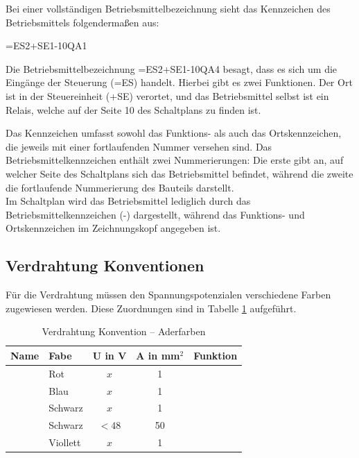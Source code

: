 Bei einer vollständigen Betriebsmittelbezeichnung sieht das Kennzeichen des Betriebsmittels folgendermaßen aus:

\begin{center} =ES2+SE1-10QA1 \end{center}

Die Betriebsmittelbezeichnung =ES2+SE1-10QA4 besagt, dass es sich um die Eingänge der Steuerung (=ES) handelt. Hierbei gibt es zwei Funktionen. Der Ort ist in der Steuereinheit (+SE) verortet, und das Betriebsmittel selbst ist ein Relais, welche auf der Seite 10 des Schaltplans zu finden ist.

Das Kennzeichen umfasst sowohl das Funktions- als auch das Ortskennzeichen, die jeweils mit einer fortlaufenden Nummer versehen sind. Das Betriebsmittelkennzeichen enthält zwei Nummerierungen: Die erste gibt an, auf welcher Seite des Schaltplans sich das Betriebsmittel befindet, während die zweite die fortlaufende Nummerierung des Bauteils darstellt.\\
Im Schaltplan wird das Betriebsmittel lediglich durch das Betriebsmittelkennzeichen (-) dargestellt, während das Funktions- und Ortskennzeichen im Zeichnungskopf angegeben ist.

\newpage

\subsection{Verdrahtung Konventionen}
\label{section:Verdrahtung_Konventionen}
Für die Verdrahtung müssen den Spannungspotenzialen verschiedene Farben zugewiesen werden. Diese Zuordnungen sind in Tabelle \ref{Verdrahtung_Konventionen:tab:Zuordnung} aufgeführt.
\pagebreak[1]
\begin{table}[ht!]
	\centering
	\caption{Verdrahtung Konvention – Aderfarben}
	\label{Verdrahtung_Konventionen:tab:Zuordnung}
	\begin{tabular}{llccl}
		\hline
		\textbf{Name} & \textbf{Fabe}                 & \textbf{U in V} & \textbf{A in mm$^2$} & \textbf{Funktion} \\ \hline
		              & \multicolumn{1}{l|}{Rot}      & $x$             & 1                    &                   \\
		              & \multicolumn{1}{l|}{Blau}     & $x$             & 1                    &                   \\
		              & \multicolumn{1}{l|}{Schwarz}  & $x$             & 1                    &                   \\
		              & \multicolumn{1}{l|}{Schwarz}  & $< 48$          & 50                   &                   \\
		              & \multicolumn{1}{l|}{Viollett} & $x$             & 1                    &                   \\ \hline
	\end{tabular}
\end{table}
\pagebreak[4]




